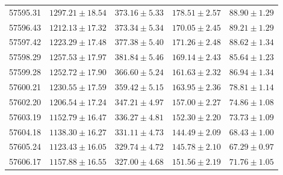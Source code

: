 \begin{table}[h]
\begin{tabular}{lcccc}
		57595.31 & $1297.21 \pm 18.54$ & $373.16 \pm 5.33$ & $178.51 \pm 2.57$ & $88.90 \pm 1.29$ \\
		57596.43 & $1212.13 \pm 17.32$ & $373.34 \pm 5.34$ & $170.05 \pm 2.45$ & $89.21 \pm 1.29$ \\
		57597.42 & $1223.29 \pm 17.48$ & $377.38 \pm 5.40$ & $171.26 \pm 2.48$ & $88.62 \pm 1.34$ \\
		57598.29 & $1257.53 \pm 17.97$ & $381.84 \pm 5.46$ & $169.14 \pm 2.43$ & $85.64 \pm 1.23$ \\
		57599.28 & $1252.72 \pm 17.90$ & $366.60 \pm 5.24$ & $161.63 \pm 2.32$ & $86.94 \pm 1.34$ \\
		57600.21 & $1230.55 \pm 17.59$ & $359.42 \pm 5.15$ & $163.95 \pm 2.36$ & $78.81 \pm 1.14$ \\
		57602.20 & $1206.54 \pm 17.24$ & $347.21 \pm 4.97$ & $157.00 \pm 2.27$ & $74.86 \pm 1.08$ \\
		57603.19 & $1152.79 \pm 16.47$ & $336.27 \pm 4.81$ & $152.30 \pm 2.20$ & $73.73 \pm 1.09$ \\
		57604.18 & $1138.30 \pm 16.27$ & $331.11 \pm 4.73$ & $144.49 \pm 2.09$ & $68.43 \pm 1.00$ \\
		57605.24 & $1123.43 \pm 16.05$ & $329.74 \pm 4.72$ & $145.78 \pm 2.10$ & $67.29 \pm 0.97$ \\
		57606.17 & $1157.88 \pm 16.55$ & $327.00 \pm 4.68$ & $151.56 \pm 2.19$ & $71.76 \pm 1.05$ \\
		\hline
	\end{tabular}
	\label{tab:balmer}
\end{table}
\newpage

